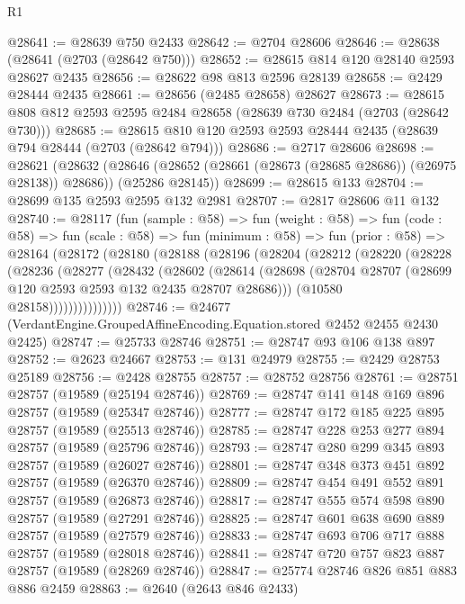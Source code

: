 \begin{lexlean}{R1}
\begin{coremodule}
@28641 := @28639 @750 @2433
@28642 := @2704 @28606
@28646 := @28638 (@28641 (@2703 (@28642 @750)))
@28652 := @28615 @814 @120 @28140 @2593 @28627 @2435
@28656 := @28622 @98 @813 @2596 @28139
@28658 := @2429 @28444 @2435
@28661 := @28656 (@2485 @28658) @28627
@28673 := @28615 @808 @812 @2593 @2595 @2484 @28658 (@28639 @730 @2484 (@2703 (@28642 @730)))
@28685 := @28615 @810 @120 @2593 @2593 @28444 @2435 (@28639 @794 @28444 (@2703 (@28642 @794)))
@28686 := @2717 @28606
@28698 := @28621
    (@28632
      (@28646 (@28652 (@28661 (@28673 (@28685 @28686)) (@26975 @28138)) @28686))
      (@25286 @28145))
@28699 := @28615 @133
@28704 := @28699 @135 @2593 @2595 @132 @2981
@28707 := @2817 @28606 @11 @132
@28740 := @28117
    (fun (sample : @58) =>
    fun (weight : @58) =>
    fun (code : @58) =>
    fun (scale : @58) =>
    fun (minimum : @58) =>
    fun (prior : @58) =>
    @28164
      (@28172
        (@28180
          (@28188
            (@28196
              (@28204
                (@28212
                  (@28220
                    (@28228
                      (@28236
                        (@28277
                          (@28432
                            (@28602
                              (@28614
                                (@28698
                                  (@28704
                                    @28707
                                    (@28699 @120 @2593 @2593 @132 @2435 @28707 @28686)))
                                (@10580 @28158)))))))))))))))
@28746 := @24677 (VerdantEngine.GroupedAffineEncoding.Equation.stored @2452 @2455 @2430 @2425)
@28747 := @25733 @28746
@28751 := @28747 @93 @106 @138 @897
@28752 := @2623 @24667
@28753 := @131 @24979
@28755 := @2429 @28753 @25189
@28756 := @2428 @28755
@28757 := @28752 @28756
@28761 := @28751 @28757 (@19589 (@25194 @28746))
@28769 := @28747 @141 @148 @169 @896 @28757 (@19589 (@25347 @28746))
@28777 := @28747 @172 @185 @225 @895 @28757 (@19589 (@25513 @28746))
@28785 := @28747 @228 @253 @277 @894 @28757 (@19589 (@25796 @28746))
@28793 := @28747 @280 @299 @345 @893 @28757 (@19589 (@26027 @28746))
@28801 := @28747 @348 @373 @451 @892 @28757 (@19589 (@26370 @28746))
@28809 := @28747 @454 @491 @552 @891 @28757 (@19589 (@26873 @28746))
@28817 := @28747 @555 @574 @598 @890 @28757 (@19589 (@27291 @28746))
@28825 := @28747 @601 @638 @690 @889 @28757 (@19589 (@27579 @28746))
@28833 := @28747 @693 @706 @717 @888 @28757 (@19589 (@28018 @28746))
@28841 := @28747 @720 @757 @823 @887 @28757 (@19589 (@28269 @28746))
@28847 := @25774 @28746 @826 @851 @883 @886 @2459
@28863 := @2640
    (@2643 @846 @2433)

\end{coremodule}
\end{lexlean}
